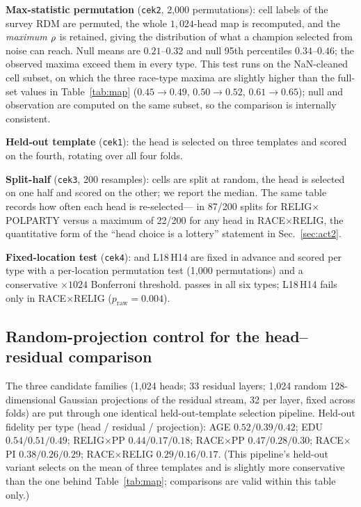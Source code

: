 \textbf{Max-statistic permutation} (\texttt{cek2}, 2{,}000 permutations):
cell labels of the survey RDM are permuted, the whole $1{,}024$-head map
is recomputed, and the \emph{maximum} $\rho$ is retained, giving the
distribution of what a champion selected from noise can reach. Null
means are $0.21$--$0.32$ and null 95th percentiles $0.34$--$0.46$; the
observed maxima exceed them in every type. This test runs on the
NaN-cleaned cell subset, on which the three race-type maxima are slightly
higher than the full-set values in Table~\ref{tab:map}
($0.45\!\to\!0.49$, $0.50\!\to\!0.52$, $0.61\!\to\!0.65$); null and
observation are computed on the same subset, so the comparison is
internally consistent.

\textbf{Held-out template} (\texttt{cek1}): the head is selected on three
templates and scored on the fourth, rotating over all four folds.

\textbf{Split-half} (\texttt{cek3}, 200 resamples): cells are split at
random, the head is selected on one half and scored on the other; we
report the median. The same table records how often each head is
re-selected---\starhead{} in 87/200 splits for RELIG$\times$POLPARTY
versus a maximum of 22/200 for any head in RACE$\times$RELIG, the
quantitative form of the ``head choice is a lottery'' statement in
Sec.~\ref{sec:act2}.

\textbf{Fixed-location test} (\texttt{cek4}): \starhead{} and L18\,H14
are fixed in advance and scored per type with a per-location permutation
test (1{,}000 permutations) and a conservative $\times1024$ Bonferroni
threshold. \starhead{} passes in all six types; L18\,H14 fails only in
RACE$\times$RELIG ($p_{\text{raw}}=0.004$).

\subsection{Random-projection control for the head--residual comparison}
\label{app:randproj}
The three candidate families (1{,}024 heads; 33 residual layers; 1{,}024
random 128-dimensional Gaussian projections of the residual stream, 32
per layer, fixed across folds) are put through one identical
held-out-template selection pipeline. Held-out fidelity per type
(head / residual / projection): AGE $0.52/0.39/0.42$; EDU
$0.54/0.51/0.49$; RELIG$\times$PP $0.44/0.17/0.18$; RACE$\times$PP
$0.47/0.28/0.30$; RACE$\times$PI $0.38/0.26/0.29$; RACE$\times$RELIG
$0.29/0.16/0.17$. (This pipeline's held-out variant selects on the mean
of three templates and is slightly more conservative than the one behind
Table~\ref{tab:map}; comparisons are valid within this table only.)

